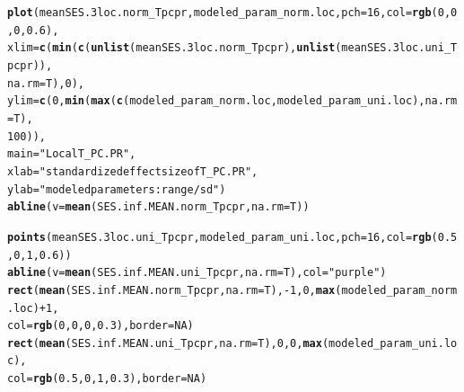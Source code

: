 \documentclass[12pt]{article}\usepackage[]{graphicx}\usepackage[]{color}
\makeatletter
\newcommand{\hlnum}[1]{\textcolor[rgb]{0.686,0.059,0.569}{#1}}%
\newcommand{\hlstr}[1]{\textcolor[rgb]{0.192,0.494,0.8}{#1}}%
\newcommand{\hlopt}[1]{\textcolor[rgb]{0,0,0}{#1}}%
\newcommand{\hlstd}[1]{\textcolor[rgb]{0.345,0.345,0.345}{#1}}%
\newcommand{\hlkwc}[1]{\textcolor[rgb]{0.333,0.667,0.333}{#1}}%
\newcommand{\hlkwd}[1]{\textcolor[rgb]{0.737,0.353,0.396}{\textbf{#1}}}%
\newenvironment{kframe}{%
 \def\at@end@of@kframe{}%
 \ifinner\ifhmode%
  \def\at@end@of@kframe{\end{minipage}}%
  \begin{minipage}{\columnwidth}%
 \fi\fi%
 \def\FrameCommand##1{\hskip\@totalleftmargin \hskip-\fboxsep
 \colorbox{shadecolor}{##1}\hskip-\fboxsep
     \hskip-\linewidth \hskip-\@totalleftmargin \hskip\columnwidth}%
 \MakeFramed {\advance\hsize-\width
   \@totalleftmargin\z@ \linewidth\hsize
   \@setminipage}}%
 {\par\unskip\endMakeFramed%
 \at@end@of@kframe}
\newenvironment{knitrout}{}{} %
\makeatother
\begin{document}
\begin{knitrout}\small
{}\color{fgcolor}\begin{kframe}
\begin{alltt}
\hlkwd{plot}\hlstd{(meanSES.3loc.norm_Tpcpr, modeled_param_norm.loc,} \hlkwc{pch} \hlstd{=} \hlnum{16}\hlstd{,} \hlkwc{col} \hlstd{=} \hlkwd{rgb}\hlstd{(}\hlnum{0}\hlstd{,} \hlnum{0}\hlstd{,} \hlnum{0}\hlstd{,} \hlnum{0.6}\hlstd{),}
     \hlkwc{xlim} \hlstd{=} \hlkwd{c}\hlstd{(}\hlkwd{min}\hlstd{(}\hlkwd{c}\hlstd{(}\hlkwd{unlist}\hlstd{(meanSES.3loc.norm_Tpcpr),} \hlkwd{unlist}\hlstd{(meanSES.3loc.uni_Tpcpr)),}
              \hlkwc{na.rm} \hlstd{= T),} \hlnum{0}\hlstd{),}
     \hlkwc{ylim} \hlstd{=} \hlkwd{c}\hlstd{(}\hlnum{0}\hlstd{,} \hlkwd{min}\hlstd{(}\hlkwd{max}\hlstd{(}\hlkwd{c}\hlstd{(modeled_param_norm.loc, modeled_param_uni.loc),} \hlkwc{na.rm} \hlstd{= T),}
                     \hlnum{100}\hlstd{)),}
     \hlkwc{main} \hlstd{=} \hlstr{"Local T_PC.PR"}\hlstd{,}
     \hlkwc{xlab} \hlstd{=} \hlstr{"standardized effect size of T_PC.PR"}\hlstd{,}
     \hlkwc{ylab} \hlstd{=} \hlstr{"modeled parameters: range/sd"}\hlstd{)}
\hlkwd{abline}\hlstd{(}\hlkwc{v} \hlstd{=} \hlkwd{mean}\hlstd{(SES.inf.MEAN.norm_Tpcpr,} \hlkwc{na.rm} \hlstd{= T))}

\hlkwd{points}\hlstd{(meanSES.3loc.uni_Tpcpr, modeled_param_uni.loc,} \hlkwc{pch} \hlstd{=} \hlnum{16}\hlstd{,} \hlkwc{col} \hlstd{=} \hlkwd{rgb}\hlstd{(}\hlnum{0.5}\hlstd{,} \hlnum{0}\hlstd{,} \hlnum{1}\hlstd{,} \hlnum{0.6}\hlstd{))}
\hlkwd{abline}\hlstd{(}\hlkwc{v} \hlstd{=} \hlkwd{mean}\hlstd{(SES.inf.MEAN.uni_Tpcpr,} \hlkwc{na.rm} \hlstd{= T),} \hlkwc{col} \hlstd{=} \hlstr{"purple"}\hlstd{)}
\hlkwd{rect}\hlstd{(}\hlkwd{mean}\hlstd{(SES.inf.MEAN.norm_Tpcpr,} \hlkwc{na.rm} \hlstd{= T),} \hlopt{-}\hlnum{1}\hlstd{,} \hlnum{0}\hlstd{,} \hlkwd{max}\hlstd{(modeled_param_norm.loc)} \hlopt{+} \hlnum{1}\hlstd{,}
     \hlkwc{col} \hlstd{=} \hlkwd{rgb}\hlstd{(}\hlnum{0}\hlstd{,} \hlnum{0}\hlstd{,} \hlnum{0}\hlstd{,} \hlnum{0.3}\hlstd{),} \hlkwc{border} \hlstd{=} \hlnum{NA}\hlstd{)}
\hlkwd{rect}\hlstd{(}\hlkwd{mean}\hlstd{(SES.inf.MEAN.uni_Tpcpr,} \hlkwc{na.rm} \hlstd{= T),} \hlnum{0}\hlstd{,} \hlnum{0}\hlstd{,} \hlkwd{max}\hlstd{(modeled_param_uni.loc),}
     \hlkwc{col} \hlstd{=} \hlkwd{rgb}\hlstd{(}\hlnum{0.5}\hlstd{,} \hlnum{0}\hlstd{,} \hlnum{1}\hlstd{,} \hlnum{0.3}\hlstd{),} \hlkwc{border} \hlstd{=} \hlnum{NA}\hlstd{)}
\end{alltt}
\end{kframe}\begin{figure}


\end{figure}
\end{knitrout}
\end{document}

